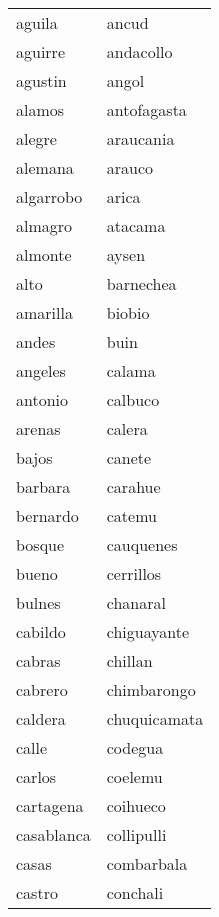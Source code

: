 \begin{longtable}{l|l}
             aguila   &  ancud   \\  
             aguirre   &  andacollo   \\  
             agustin   &  angol   \\  
             alamos   &  antofagasta   \\  
             alegre   &  araucania   \\  
             alemana   &  arauco   \\  
             algarrobo   &  arica   \\  
             almagro   &  atacama   \\  
             almonte   &  aysen   \\  
             alto   &  barnechea   \\  
             amarilla   &  biobio   \\  
             andes   &  buin   \\  
             angeles   &  calama   \\  
             antonio   &  calbuco   \\  
             arenas   &  calera   \\  
             bajos   &  canete   \\  
             barbara   &  carahue   \\  
             bernardo   &  catemu   \\  
             bosque   &  cauquenes   \\  
             bueno   &  cerrillos   \\  
             bulnes   &  chanaral   \\  
             cabildo   &  chiguayante   \\  
             cabras   &  chillan   \\  
             cabrero   &  chimbarongo   \\  
             caldera   &  chuquicamata   \\  
             calle   &  codegua   \\  
             carlos   &  coelemu   \\  
             cartagena   &  coihueco   \\  
             casablanca   &  collipulli   \\  
             casas   &  combarbala   \\  
             castro   &  conchali   \\  

\end{longtable}

